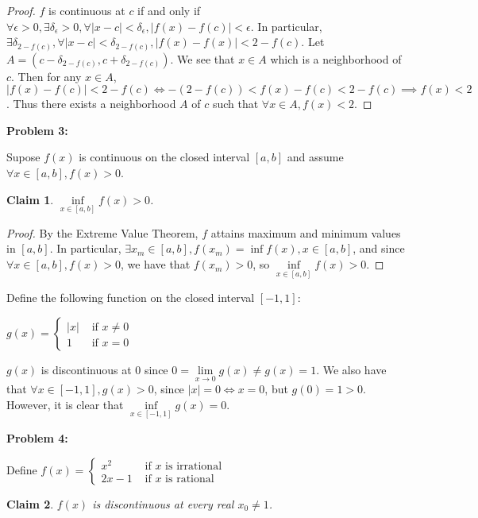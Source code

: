 \documentclass{article}
\newcommand{\eps}{\ensuremath{\epsilon}}
\newcommand{\pt}[1]{\textrm{ #1 }}
\newtheorem{clm}{Claim}
\begin{document}
\begin{proof}
	$f$ is continuous at $c$ if and only if
	$\forall \eps > 0, \exists \delta_\eps > 0,
	\forall |x - c| < \delta_\eps, |f(x) - f(c)| < \eps$.
	In particular,
	$\exists \delta_{2-f(c)}, \forall |x - c| < \delta_{2-f(c)}, |f(x) - f(x)| < 2 - f(c)$.
	Let $A = (c - \delta_{2 - f(c)}, c + \delta_{2 - f(c)})$.
	We see that $x \in A$ which is a neighborhood of $c$.
	Then for any $x \in A$, $|f(x) - f(c)| < 2 - f(c) \iff -(2 - f(c)) < f(x) - f(c) < 2 - f(c)
	\implies f(x) < 2$.
	Thus there exists a neighborhood $A$ of $c$ such that $\forall x \in A, f(x) < 2$.
\end{proof}

\textbf{Problem 3:}

Supose $f(x)$ is continuous on the closed interval $[a,b]$ and assume $\forall x \in [a,b], f(x) > 0$.

\begin{clm}
	$\underset{x \in [a,b]}{\inf} f(x) > 0$.
\end{clm}

\begin{proof}
	By the Extreme Value Theorem,
	$f$ attains maximum and minimum values in $[a,b]$.
	In particular, $\exists x_m \in [a,b], f(x_m) = \inf {f(x), x \in [a,b]}$,
	and since $\forall x \in [a,b], f(x) > 0$,
	we have that $f(x_m) > 0$,
	so $\underset{x \in [a,b]}{\inf} f(x) > 0$.
\end{proof}

Define the following function on the closed interval $[-1, 1]$:

$g(x) = \begin{cases} |x| & \pt{if $x \neq 0$} \\ 1 & \pt{if $x = 0$} \end{cases}$

$g(x)$ is discontinuous at $0$ since $0 = \underset{x \to 0}{\lim} g(x) \neq g(x) = 1$.
We also have that $\forall x \in [-1, 1], g(x) > 0$,
since $|x| = 0 \iff x = 0$, but $g(0) = 1 > 0$.
However, it is clear that $\underset{x \in [-1,1]}{\inf} g(x) = 0$.

\medskip

\textbf{Problem 4:}

Define $f(x) = \begin{cases} x^2 & \pt{if $x$ is irrational} \\ 2x-1 & \pt{if $x$ is rational} \end{cases}$

\begin{clm}
	$f(x)$ is discontinuous at every real $x_0 \neq 1$.
\end{clm}
\end{document}
